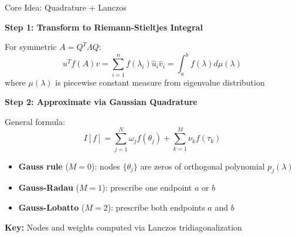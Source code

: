 \documentclass[aspectratio=169, 12pt]{beamer}
\begin{document}
\begin{frame}{Core Idea: Quadrature + Lanczos}

\textbf{Step 1: Transform to Riemann-Stieltjes Integral}

For symmetric \(A = Q^T \Lambda Q\):
\[
u^T f(A) v = \sum_{i=1}^n f(\lambda_i) \hat{u}_i \hat{v}_i = \int_a^b f(\lambda) d\mu(\lambda)
\]
where \(\mu(\lambda)\) is piecewise constant measure from eigenvalue distribution

\vspace{0.3cm}

\textbf{Step 2: Approximate via Gaussian Quadrature}

General formula:
\[
I[f] = \sum_{j=1}^N \omega_j f(\theta_j) + \sum_{k=1}^M \nu_k f(\tau_k)
\]

\begin{itemize}
    \item \textbf{Gauss rule} (\(M=0\)): nodes \(\{\theta_j\}\) are zeros of orthogonal polynomial \(p_j(\lambda)\)
    \item \textbf{Gauss-Radau} (\(M=1\)): prescribe one endpoint \(a\) or \(b\)
    \item \textbf{Gauss-Lobatto} (\(M=2\)): prescribe both endpoints \(a\) and \(b\)
\end{itemize}

\vspace{0.2cm}

\textbf{Key:} Nodes and weights computed via \alert{Lanczos tridiagonalization}

\end{frame}
\end{document}
